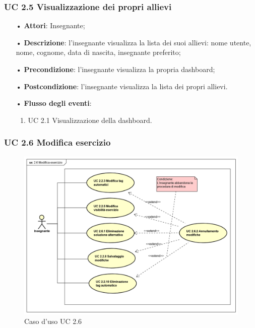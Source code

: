 \subsubsection{UC 2.5 Visualizzazione dei propri allievi}
\begin{itemize}
	\item[•] \textbf{Attori}: Insegnante;
	\item[•] \textbf{Descrizione}: l'insegnante visualizza la lista dei suoi allievi: nome utente, nome, cognome, data di nascita, insegnante preferito;
	\item[•] \textbf{Precondizione}: l'insegnante visualizza la propria dashboard;
	\item[•] \textbf{Postcondizione}: l'insegnante visualizza la lista dei propri allievi.
	\item[•] \textbf{Flusso degli eventi}:
		\begin{enumerate}
		\item UC 2.1 Visualizzazione della dashboard.
	\end{enumerate}
\end{itemize}

\subsubsection{UC 2.6 Modifica esercizio}
\begin{figure}[H]
\centering
\includegraphics[width=17cm]{img/UC26.png} 
\caption{Caso d'uso UC 2.6}
\end{figure}

